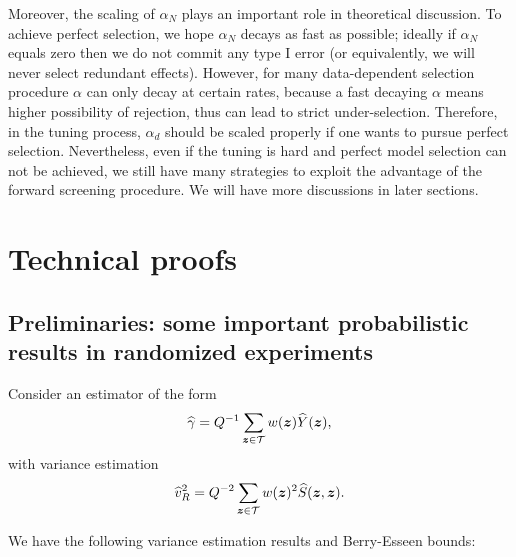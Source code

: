 \documentclass[12pt]{article}
\begin{document}
Moreover, the scaling of $\alpha_N$ plays an important role in theoretical discussion. To achieve perfect selection, we hope $\alpha_N$ decays as fast as possible; ideally if $\alpha_N$ equals zero then we do not commit any type I error (or equivalently, we will never select redundant effects). However, for many data-dependent selection procedure $\alpha$ can only decay at certain rates, because a fast decaying $\alpha$ means higher possibility of rejection, thus can lead to strict under-selection. Therefore, in the tuning process, $\alpha_d$ should be scaled properly if one wants to pursue perfect selection. Nevertheless, even if the tuning is hard and perfect model selection can not be achieved, we still have many strategies to exploit the advantage of the forward screening procedure. We will have more discussions in later sections.




\section{Technical proofs}
\subsection{Preliminaries: some important probabilistic results in randomized experiments}

Consider an estimator of the form
\begin{align*}
    {\widehat{\gamma}} = Q^{-1}\sum_{{\boldsymbol{z}}\in{\mathcal{T}}} w({\boldsymbol{z}})\widehat{Y}({\boldsymbol{z}}),
\end{align*}
with variance estimation
\begin{align*}
    \widehat{v}^2_R = Q^{-2}\sum_{{\boldsymbol{z}}\in{\mathcal{T}}} w({\boldsymbol{z}})^2 \widehat{S}({\boldsymbol{z}},{\boldsymbol{z}}).
\end{align*}

We have the following variance estimation results and Berry-Esseen bounds:
\end{document}
